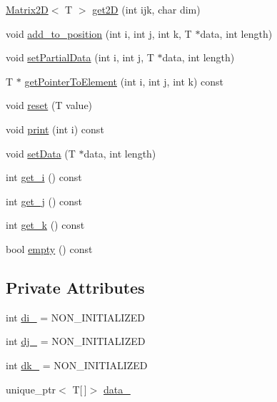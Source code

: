 \begin{DoxyCompactItemize}
\mbox{\hyperlink{classMatrix2D}{Matrix2D}}$<$ T $>$ \mbox{\hyperlink{classMatrix3D_ac5c77248be46bfef323f0229f6e0a59c_ac5c77248be46bfef323f0229f6e0a59c}{get2D}} (int ijk, char dim)
\item 
void \mbox{\hyperlink{classMatrix3D_a61afc3a397203f453f60772ebc10758a_a61afc3a397203f453f60772ebc10758a}{add\+\_\+to\+\_\+position}} (int i, int j, int k, T $\ast$data, int length)
\item 
void \mbox{\hyperlink{classMatrix3D_a46a7b732a44b77f6c09f72c0ae05edef_a46a7b732a44b77f6c09f72c0ae05edef}{set\+Partial\+Data}} (int i, int j, T $\ast$data, int length)
\item 
T $\ast$ \mbox{\hyperlink{classMatrix3D_ac21cf8967053b928f609b98abf1616e2_ac21cf8967053b928f609b98abf1616e2}{get\+Pointer\+To\+Element}} (int i, int j, int k) const
\item 
void \mbox{\hyperlink{classMatrix3D_ac67d3ee632ccafaac86dfacdda95dfdf_ac67d3ee632ccafaac86dfacdda95dfdf}{reset}} (T value)
\item 
void \mbox{\hyperlink{classMatrix3D_abc1d3451a2fb3cce0bec1d1e33097b1e_abc1d3451a2fb3cce0bec1d1e33097b1e}{print}} (int i) const
\item 
void \mbox{\hyperlink{classMatrix3D_a056c035f4997b14c2a3e2b8ebee5142c_a056c035f4997b14c2a3e2b8ebee5142c}{set\+Data}} (T $\ast$data, int length)
\item 
int \mbox{\hyperlink{classMatrix3D_af02576e685de872ba1b75014d9a609c9_af02576e685de872ba1b75014d9a609c9}{get\+\_\+i}} () const
\item 
int \mbox{\hyperlink{classMatrix3D_a083e3f136a0108aad991e194b078db7f_a083e3f136a0108aad991e194b078db7f}{get\+\_\+j}} () const
\item 
int \mbox{\hyperlink{classMatrix3D_a35fad9c3c81914e0ef5ed40ceda5d324_a35fad9c3c81914e0ef5ed40ceda5d324}{get\+\_\+k}} () const
\item 
bool \mbox{\hyperlink{classMatrix3D_a6f1e6328bac16786a4bfad6f107db641_a6f1e6328bac16786a4bfad6f107db641}{empty}} () const
\end{DoxyCompactItemize}
\subsection*{Private Attributes}
\begin{DoxyCompactItemize}
\item 
int \mbox{\hyperlink{classMatrix3D_af1e032d3ea19a5fc312866bd401e0f2b_af1e032d3ea19a5fc312866bd401e0f2b}{di\+\_\+}} = N\+O\+N\+\_\+\+I\+N\+I\+T\+I\+A\+L\+I\+Z\+ED
\item 
int \mbox{\hyperlink{classMatrix3D_a204c91363d19e8dc16bf911dfd72b912_a204c91363d19e8dc16bf911dfd72b912}{dj\+\_\+}} = N\+O\+N\+\_\+\+I\+N\+I\+T\+I\+A\+L\+I\+Z\+ED
\item 
int \mbox{\hyperlink{classMatrix3D_a9c5ce04b3a1cb28c7b19cd3b9b3646c6_a9c5ce04b3a1cb28c7b19cd3b9b3646c6}{dk\+\_\+}} = N\+O\+N\+\_\+\+I\+N\+I\+T\+I\+A\+L\+I\+Z\+ED
\item 
unique\+\_\+ptr$<$ T\mbox{[}$\,$\mbox{]}$>$ \mbox{\hyperlink{classMatrix3D_a94b477ac7008ab81acd18f2ee4d41d70_a94b477ac7008ab81acd18f2ee4d41d70}{data\+\_\+}}
\end{DoxyCompactItemize}


